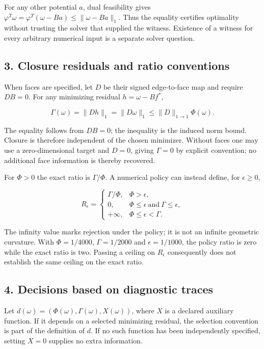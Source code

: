 \documentclass[
]{article}
\begin{document}
For any other potential \(a\), dual feasibility gives
\(\varphi^T\omega=\varphi^T(\omega-Ba)\le\|\omega-Ba\|_1\). Thus the
equality certifies optimality without trusting the solver that supplied
the witness. Existence of a witness for every arbitrary numerical input
is a separate solver question.

\subsection{3. Closure residuals and ratio
conventions}\label{closure-residuals-and-ratio-conventions}

When faces are specified, let \(D\) be their signed edge-to-face map and
require \(DB=0\). For any minimizing residual \(h=\omega-Bf^*\),

\[
\Gamma(\omega)=\|Dh\|_1=\|D\omega\|_1
\le\|D\|_{1\to1}\Phi(\omega).
\]

The equality follows from \(DB=0\); the inequality is the induced norm
bound. Closure is therefore independent of the chosen minimizer. Without
faces one may use a zero-dimensional target and \(D=0\), giving
\(\Gamma=0\) by explicit convention; no additional face information is
thereby recovered.

For \(\Phi>0\) the exact ratio is \(\Gamma/\Phi\). A numerical policy
can instead define, for \(\epsilon\ge0\),

\[
R_\epsilon=
\begin{cases}
\Gamma/\Phi,&\Phi>\epsilon,\\
0,&\Phi\le\epsilon\ \text{and}\ \Gamma\le\epsilon,\\
+\infty,&\Phi\le\epsilon<\Gamma.
\end{cases}
\]

The infinity value marks rejection under the policy; it is not an
infinite geometric curvature. With \(\Phi=1/4000\), \(\Gamma=1/2000\)
and \(\epsilon=1/1000\), the policy ratio is zero while the exact ratio
is two. Passing a ceiling on \(R_\epsilon\) consequently does not
establish the same ceiling on the exact ratio.

\subsection{4. Decisions based on diagnostic
traces}\label{decisions-based-on-diagnostic-traces}

Let \(d(\omega)=(\Phi(\omega),\Gamma(\omega),X(\omega))\), where \(X\)
is a declared auxiliary function. If it depends on a selected minimizing
residual, the selection convention is part of the definition of \(d\).
If no such function has been independently specified, setting \(X=0\)
supplies no extra information.
\end{document}
